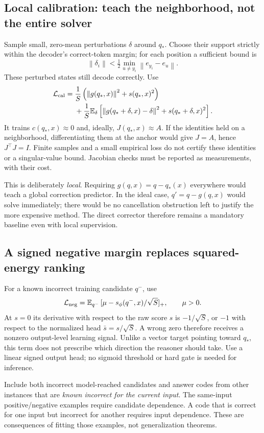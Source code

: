 \documentclass[11pt,a4paper]{article}
\newcommand{\norm}[1]{\left\lVert #1\right\rVert}
\begin{document}
\subsection{Local calibration: teach the neighborhood, not the entire solver}
Sample small, zero-mean perturbations $\delta$ around $q_*$. Choose their support strictly within the decoder's correct-token margin; for each position a sufficient bound is
\[
\norm{\delta_i}<\tfrac12\min_{u\ne y_i}\norm{e_{y_i}-e_u}.
\]
These perturbed states still decode correctly. Use
\begin{align}
\mathcal L_{\rm cal}
={}&\frac1S\left(\norm{g(q_*,x)}^2+s(q_*,x)^2\right)\nonumber\\
&+\frac1S\mathbb E_\delta\left[\norm{g(q_*+\delta,x)-\delta}^2+s(q_*+\delta,x)^2\right].\label{eq:cal}
\end{align}
It trains $c(q_*,x)\approx0$ and, ideally, $J(q_*,x)\approx A$. If the identities held on a neighborhood, differentiating them at the anchor would give $J=A$, hence $J^\top J=I$. Finite samples and a small empirical loss do not certify these identities or a singular-value bound. Jacobian checks must be reported as measurements, with their cost.

This is deliberately \emph{local}. Requiring $g(q,x)=q-q_*(x)$ everywhere would teach a global correction predictor. In the ideal case, $q'=q-g(q,x)$ would solve immediately; there would be no cancellation obstruction left to justify the more expensive method. The direct corrector therefore remains a mandatory baseline even with local supervision.

\subsection{A signed negative margin replaces squared-energy ranking}
For a known incorrect training candidate $q^-$, use
\begin{equation}
\mathcal L_{\rm neg}=\mathbb E_{q^-}\,[\mu-s_\phi(q^-,x)/\sqrt S]_+,\qquad \mu>0.\label{eq:signed}
\end{equation}
At $s=0$ its derivative with respect to the raw score $s$ is $-1/\sqrt S$, or $-1$ with respect to the normalized head $\bar s=s/\sqrt S$. A wrong zero therefore receives a nonzero output-level learning signal. Unlike a vector target pointing toward $q_*$, this term does not prescribe which direction the reasoner should take. Use a linear signed output head; no sigmoid threshold or hard gate is needed for inference.

Include both incorrect model-reached candidates and answer codes from other instances that are \emph{known incorrect for the current input}. The same-input positive/negative examples require candidate dependence. A code that is correct for one input but incorrect for another requires input dependence. These are consequences of fitting those examples, not generalization theorems.
\end{document}
